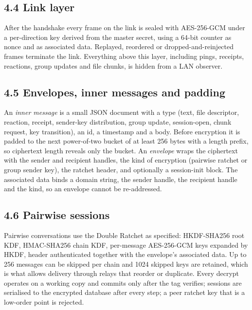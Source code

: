 \documentclass[conference]{IEEEtran}
\begin{document}
\subsection{4.4 Link layer}
After the handshake every frame on the link is sealed with AES-256-GCM under a per-direction key derived from the master secret, using a 64-bit counter as nonce and as associated data. Replayed, reordered or dropped-and-reinjected frames terminate the link. Everything above this layer, including pings, receipts, reactions, group updates and file chunks, is hidden from a LAN observer.

\subsection{4.5 Envelopes, inner messages and padding}
An \emph{inner message} is a small JSON document with a type (text, file descriptor, reaction, receipt, sender-key distribution, group update, session-open, chunk request, key transition), an id, a timestamp and a body. Before encryption it is padded to the next power-of-two bucket of at least 256 bytes with a length prefix, so ciphertext length reveals only the bucket. An \emph{envelope} wraps the ciphertext with the sender and recipient handles, the kind of encryption (pairwise ratchet or group sender key), the ratchet header, and optionally a session-init block. The associated data binds a domain string, the sender handle, the recipient handle and the kind, so an envelope cannot be re-addressed.

\subsection{4.6 Pairwise sessions}
Pairwise conversations use the Double Ratchet \cite{ref2} as specified: HKDF-SHA256 root KDF, HMAC-SHA256 chain KDF, per-message AES-256-GCM keys expanded by HKDF, header authenticated together with the envelope's associated data. Up to 256 messages can be skipped per chain and 1024 skipped keys are retained, which is what allows delivery through relays that reorder or duplicate. Every decrypt operates on a working copy and commits only after the tag verifies; sessions are serialised to the encrypted database after every step; a peer ratchet key that is a low-order point is rejected.
\end{document}
